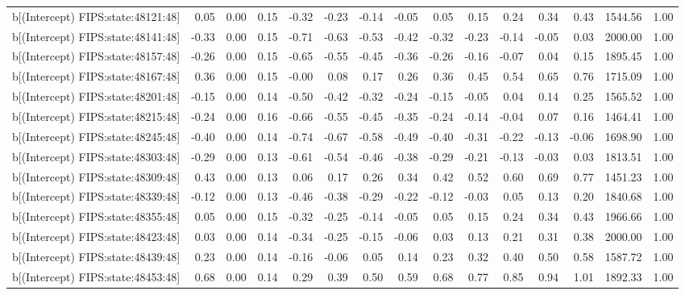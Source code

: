 \begin{table}[ht]
\begin{tabular}{rrrrrrrrrrrrrrr}
  b[(Intercept) FIPS:state:48121:48] & 0.05 & 0.00 & 0.15 & -0.32 & -0.23 & -0.14 & -0.05 & 0.05 & 0.15 & 0.24 & 0.34 & 0.43 & 1544.56 & 1.00 \\ 
  b[(Intercept) FIPS:state:48141:48] & -0.33 & 0.00 & 0.15 & -0.71 & -0.63 & -0.53 & -0.42 & -0.32 & -0.23 & -0.14 & -0.05 & 0.03 & 2000.00 & 1.00 \\ 
  b[(Intercept) FIPS:state:48157:48] & -0.26 & 0.00 & 0.15 & -0.65 & -0.55 & -0.45 & -0.36 & -0.26 & -0.16 & -0.07 & 0.04 & 0.15 & 1895.45 & 1.00 \\ 
  b[(Intercept) FIPS:state:48167:48] & 0.36 & 0.00 & 0.15 & -0.00 & 0.08 & 0.17 & 0.26 & 0.36 & 0.45 & 0.54 & 0.65 & 0.76 & 1715.09 & 1.00 \\ 
  b[(Intercept) FIPS:state:48201:48] & -0.15 & 0.00 & 0.14 & -0.50 & -0.42 & -0.32 & -0.24 & -0.15 & -0.05 & 0.04 & 0.14 & 0.25 & 1565.52 & 1.00 \\ 
  b[(Intercept) FIPS:state:48215:48] & -0.24 & 0.00 & 0.16 & -0.66 & -0.55 & -0.45 & -0.35 & -0.24 & -0.14 & -0.04 & 0.07 & 0.16 & 1464.41 & 1.00 \\ 
  b[(Intercept) FIPS:state:48245:48] & -0.40 & 0.00 & 0.14 & -0.74 & -0.67 & -0.58 & -0.49 & -0.40 & -0.31 & -0.22 & -0.13 & -0.06 & 1698.90 & 1.00 \\ 
  b[(Intercept) FIPS:state:48303:48] & -0.29 & 0.00 & 0.13 & -0.61 & -0.54 & -0.46 & -0.38 & -0.29 & -0.21 & -0.13 & -0.03 & 0.03 & 1813.51 & 1.00 \\ 
  b[(Intercept) FIPS:state:48309:48] & 0.43 & 0.00 & 0.13 & 0.06 & 0.17 & 0.26 & 0.34 & 0.42 & 0.52 & 0.60 & 0.69 & 0.77 & 1451.23 & 1.00 \\ 
  b[(Intercept) FIPS:state:48339:48] & -0.12 & 0.00 & 0.13 & -0.46 & -0.38 & -0.29 & -0.22 & -0.12 & -0.03 & 0.05 & 0.13 & 0.20 & 1840.68 & 1.00 \\ 
  b[(Intercept) FIPS:state:48355:48] & 0.05 & 0.00 & 0.15 & -0.32 & -0.25 & -0.14 & -0.05 & 0.05 & 0.15 & 0.24 & 0.34 & 0.43 & 1966.66 & 1.00 \\ 
  b[(Intercept) FIPS:state:48423:48] & 0.03 & 0.00 & 0.14 & -0.34 & -0.25 & -0.15 & -0.06 & 0.03 & 0.13 & 0.21 & 0.31 & 0.38 & 2000.00 & 1.00 \\ 
  b[(Intercept) FIPS:state:48439:48] & 0.23 & 0.00 & 0.14 & -0.16 & -0.06 & 0.05 & 0.14 & 0.23 & 0.32 & 0.40 & 0.50 & 0.58 & 1587.72 & 1.00 \\ 
  b[(Intercept) FIPS:state:48453:48] & 0.68 & 0.00 & 0.14 & 0.29 & 0.39 & 0.50 & 0.59 & 0.68 & 0.77 & 0.85 & 0.94 & 1.01 & 1892.33 & 1.00 \\ 

\end{tabular}
\end{table}
